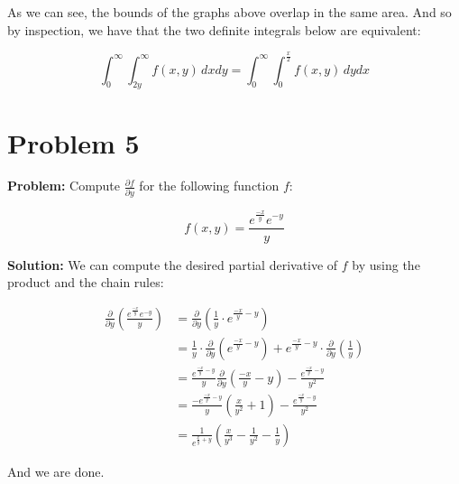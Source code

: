 \documentclass{article}
\begin{document}
\begin{center}
{
    }
\end{center}

As we can see, the bounds of the graphs above overlap in the same area. And so by inspection, we have that the two definite integrals below are equivalent:

$$\int_0^\infty\int_{2y}^\infty f(x,y)\,dxdy=\int_0^\infty\int_{0}^{\frac{x}{2}} f(x,y)\,dydx$$

\section*{Problem 5}
\noindent\textbf{Problem:} Compute $\frac{\partial f}{\partial y}$ for the following function $f$:

$$f(x,y)=\frac{e^{\frac{-x}{y}}e^{-y}}{y}$$

\noindent\textbf{Solution:} We can compute the desired partial derivative of $f$ by using the product and the chain rules:

\begin{align*}
    \frac{\partial}{\partial y}\left(\frac{e^{\frac{-x}{y}}e^{-y}}{y}\right)&=\frac{\partial}{\partial y}\left(\frac{1}{y}\cdot e^{\frac{-x}{y}-y}\right)\\
    &=\frac{1}{y}\cdot\frac{\partial}{\partial y}\left(e^{\frac{-x}{y}-y}\right)+e^{\frac{-x}{y}-y}\cdot\frac{\partial}{\partial y}\left(\frac{1}{y}\right)\\
    &=\frac{e^{\frac{-x}{y}-y}}{y}\frac{\partial}{\partial y}\left(\frac{-x}{y}-y\right)-\frac{e^{\frac{-x}{y}-y}}{y^2}\\
    &=\frac{-e^{\frac{-x}{y}-y}}{y}\left(\frac{x}{y^2}+1\right)-\frac{e^{\frac{-x}{y}-y}}{y^2}\\
    &=\frac{1}{e^{\frac{x}{y}+y}}\left(\frac{x}{y^3}-\frac{1}{y^2}-\frac{1}{y}\right)
\end{align*}

And we are done.
\end{document}
